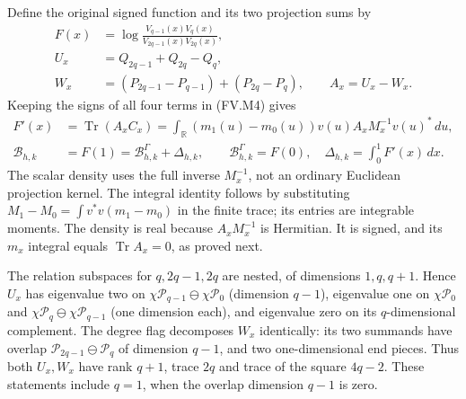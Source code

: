 Define the original signed function and its two projection sums by
\[
 \begin{aligned}
 F(x)&=\log\frac{V_{q-1}(x)V_q(x)}{V_{2q-1}(x)V_{2q}(x)},\\
 U_x&=Q_{2q-1}+Q_{2q}-Q_q,\\
 W_x&=(P_{2q-1}-P_{q-1})+(P_{2q}-P_q),\qquad A_x=U_x-W_x.
 \end{aligned}\tag{FV.M5}\label{fvmetric:signed}
\]
Keeping the signs of all four terms in (FV.M4) gives
\[
 \begin{aligned}
 F'(x)&=\operatorname{Tr}(A_xC_x)
       =\int_{\mathbb R}(m_1(u)-m_0(u))
                        v(u)A_xM_x^{-1}v(u)^*\,du,\\
 \mathcal B_{h,k}&=F(1)=\mathcal B^\Gamma_{h,k}+\Delta_{h,k},
 \qquad \mathcal B^\Gamma_{h,k}=F(0),\quad
 \Delta_{h,k}=\int_0^1 F'(x)\,dx.
 \end{aligned}\tag{FV.M6}\label{fvmetric:identity}
\]
The scalar density uses the full inverse $M_x^{-1}$, not an ordinary
Euclidean projection kernel. The integral identity follows by substituting
$M_1-M_0=\int v^*v(m_1-m_0)$ in the finite trace; its entries are
integrable moments. The density is real because
$A_xM_x^{-1}$ is Hermitian. It is signed, and its $m_x$ integral
equals $\operatorname{Tr}A_x=0$, as proved next.

The relation subspaces for $q,2q-1,2q$ are nested, of dimensions
$1,q,q+1$. Hence $U_x$ has eigenvalue two on
$\chi\mathcal P_{q-1}\ominus\chi\mathcal P_0$ (dimension $q-1$),
eigenvalue one on $\chi\mathcal P_0$ and
$\chi\mathcal P_q\ominus\chi\mathcal P_{q-1}$ (one dimension each),
and eigenvalue zero on its $q$-dimensional complement.
The degree flag decomposes $W_x$ identically: its two summands have
overlap $\mathcal P_{2q-1}\ominus\mathcal P_q$ of dimension $q-1$,
and two one-dimensional end pieces. Thus both $U_x,W_x$ have rank
$q+1$, trace $2q$ and trace of the square $4q-2$. These statements include
$q=1$, when the overlap dimension $q-1$ is zero.

